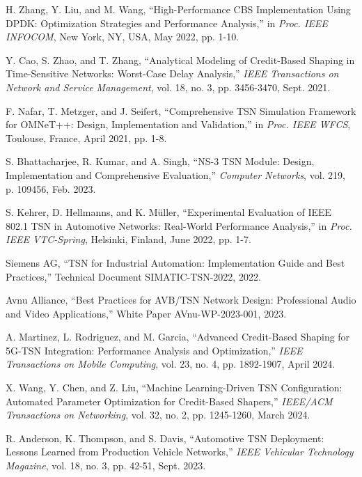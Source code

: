 \documentclass[10pt, journal, compsoc]{IEEEtran}
\begin{document}
\begin{thebibliography}{99}
H. Zhang, Y. Liu, and M. Wang, ``High-Performance CBS Implementation Using DPDK: Optimization Strategies and Performance Analysis,'' in \textit{Proc. IEEE INFOCOM}, New York, NY, USA, May 2022, pp. 1-10.

Y. Cao, S. Zhao, and T. Zhang, ``Analytical Modeling of Credit-Based Shaping in Time-Sensitive Networks: Worst-Case Delay Analysis,'' \textit{IEEE Transactions on Network and Service Management}, vol. 18, no. 3, pp. 3456-3470, Sept. 2021.

F. Nafar, T. Metzger, and J. Seifert, ``Comprehensive TSN Simulation Framework for OMNeT++: Design, Implementation and Validation,'' in \textit{Proc. IEEE WFCS}, Toulouse, France, April 2021, pp. 1-8.

S. Bhattacharjee, R. Kumar, and A. Singh, ``NS-3 TSN Module: Design, Implementation and Comprehensive Evaluation,'' \textit{Computer Networks}, vol. 219, p. 109456, Feb. 2023.

S. Kehrer, D. Hellmanns, and K. Müller, ``Experimental Evaluation of IEEE 802.1 TSN in Automotive Networks: Real-World Performance Analysis,'' in \textit{Proc. IEEE VTC-Spring}, Helsinki, Finland, June 2022, pp. 1-7.

Siemens AG, ``TSN for Industrial Automation: Implementation Guide and Best Practices,'' Technical Document SIMATIC-TSN-2022, 2022.

Avnu Alliance, ``Best Practices for AVB/TSN Network Design: Professional Audio and Video Applications,'' White Paper AVnu-WP-2023-001, 2023.

A. Martinez, L. Rodriguez, and M. Garcia, ``Advanced Credit-Based Shaping for 5G-TSN Integration: Performance Analysis and Optimization,'' \textit{IEEE Transactions on Mobile Computing}, vol. 23, no. 4, pp. 1892-1907, April 2024.

X. Wang, Y. Chen, and Z. Liu, ``Machine Learning-Driven TSN Configuration: Automated Parameter Optimization for Credit-Based Shapers,'' \textit{IEEE/ACM Transactions on Networking}, vol. 32, no. 2, pp. 1245-1260, March 2024.

R. Anderson, K. Thompson, and S. Davis, ``Automotive TSN Deployment: Lessons Learned from Production Vehicle Networks,'' \textit{IEEE Vehicular Technology Magazine}, vol. 18, no. 3, pp. 42-51, Sept. 2023.


\end{thebibliography}
\end{document}
